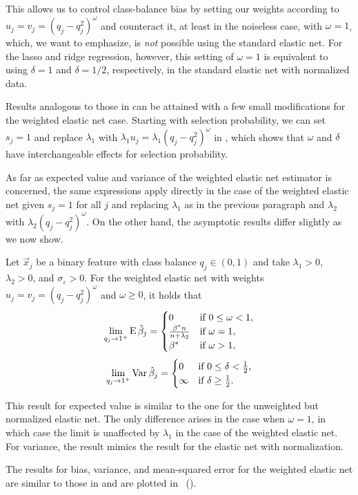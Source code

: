 This allows us to control class-balance bias by setting our weights according to \(u_j =
v_j = (q_j - q_j^2)^{\omega}\) and counteract it, at least in the noiseless case, with
\(\omega = 1\), which, we want to emphasize, is \emph{not} possible using the standard
elastic net. For the lasso and ridge regression, however, this setting of \(\omega=1\) is
equivalent to using \(\delta = 1\) and \(\delta = 1/2\), respectively, in the standard
elastic net with normalized data.

Results analogous to those in  can be attained with a few
small modifications for the weighted elastic net case. Starting with selection probability,
we can set \(s_j = 1\) and replace \(\lambda_1\) with \(\lambda_1 u_j =
\lambda_1(q_j-q_j^2)^\omega\) in , which shows that
\(\omega\) and \(\delta\) have interchangeable effects for selection probability.

As far as expected value and variance of the weighted elastic net estimator is concerned,
the same expressions apply directly in the case of the weighted elastic net given \(s_j =
1\) for all \(j\) and replacing \(\lambda_1\) as in the previous paragraph and
\(\lambda_2\) with \(\lambda_2 (q_j - q_j^2)^\omega\). On the other hand, the asymptotic
results differ slightly as we now show.

\begin{theorem}
  \label{thm:weighted-elasticnet-bias-variance}
  Let \(\vec{x}_j\) be a binary feature with class balance \(q_j \in (0, 1)\) and take
  \(\lambda_1 > 0\), \(\lambda_2 > 0\), and \(\sigma_\varepsilon > 0\). For the
  weighted elastic net with weights \(u_j = v_j = (q_j-q_j^2)^\omega\) and \(\omega \geq 0\), it holds that
  \[
    \lim_{q_j \rightarrow 1^+} \operatorname{E} \hat{\beta}_j =
    \begin{cases}
      0                              & \text{if } 0 \leq \omega < 1, \\
      \frac{\beta^*n}{n + \lambda_2} & \text{if } \omega = 1,        \\
      \beta^*                        & \text{if } \omega > 1,
    \end{cases}
  \]
  \[
    \lim_{q_j \rightarrow 1^+} \operatorname{Var} \hat{\beta}_j =
    \begin{cases}
      0      & \text{if } 0 \leq \delta < \frac{1}{2}, \\
      \infty & \text{if } \delta \geq \frac{1}{2}.
    \end{cases}
  \]
\end{theorem}

This result for expected value is similar to the one for the unweighted but normalized
elastic net. The only difference arises in the case when \(\omega = 1\), in which case the
limit is unaffected by \(\lambda_1\) in the case of the weighted elastic net. For variance,
the result mimics the result for the elastic net with normalization.

The results for bias, variance, and mean-squared error for the weighted elastic net are
similar to those in  and are plotted in
~().
